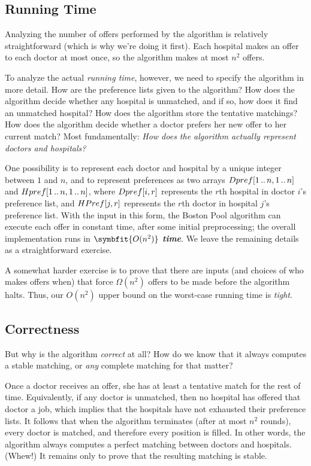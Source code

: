 \subsection{Running Time}

Analyzing the number of offers performed by the algorithm is relatively straightforward (which is why we’re doing it first).
Each hospital makes an offer to each doctor at most once, so the algorithm makes at most $n^2$ offers.

To analyze the actual \textit{running time}, however, we need to specify the algorithm in more detail.
How are the preference lists given to the algorithm?
How does the algorithm decide whether any hospital is unmatched, and if so, how does it find an unmatched hospital?
How does the algorithm store the tentative matchings?
How does the algorithm decide whether a doctor prefers her new offer to her current match?
Most fundamentally: \textit{How does the algorithm actually represent doctors and hospitals?}

One possibility is to represent each doctor and hospital by a unique integer between $1$ and $n$, and to represent preferences as two arrays $Dpref[1\,..\,n, 1\,..\,n]$ and $Hpref[1\,..\,n, 1\,..\,n]$, where $Dpref[i, r]$ represents the $r$th hospital in doctor $i$’s preference list, and $HPref[j, r]$ represents the $r$th doctor in hospital $j$’s preference list.
With the input in this form, the Boston Pool algorithm can execute each offer in constant time, after some initial preprocessing; the overall implementation runs in $\symbfit{O(n^2)}$ \textbf{\textit{time}}.
We leave the remaining details as a straightforward exercise.

A somewhat harder exercise is to prove that there are inputs (and choices of who makes offers when) that force $\Omega(n^2)$ offers to be made before the algorithm halts.
Thus, our $O(n^2)$ upper bound on the worst-case running time is \textit{tight}.

\subsection{Correctness}

But why is the algorithm \textit{correct} at all?
How do we know that it always computes a stable matching, or \textit{any} complete matching for that matter?

Once a doctor receives an offer, she has at least a tentative match for the rest of time.
Equivalently, if any doctor is unmatched, then no hospital has offered that doctor a job, which implies that the hospitals have not exhausted their preference lists.
It follows that when the algorithm terminates (after at most $n^2$ rounds), every doctor is matched, and therefore every position is filled.
In other words, the algorithm always computes a perfect matching between doctors and hospitals.
(Whew!)
It remains only to prove that the resulting matching is stable.

